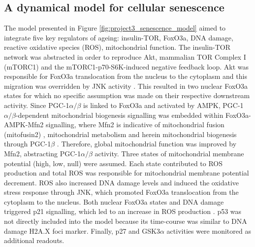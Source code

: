 \subsection{A dynamical model for cellular senescence}
\label{project3-subsec:A dynamical model for cellular senescence}
The model presented in Figure \ref{fig:project3_senescence_model} aimed to integrate five key regulators of ageing: insulin-TOR, FoxO3a, DNA damage, reactive oxidative species (ROS), mitochondrial function. The insulin-TOR network was abstracted in order to reproduce Akt, mammalian TOR Complex I (mTORC1) and the mTORC1-p70-S6K-induced negative feedback loop. Akt was responsible for FoxO3a translocation from the nucleus to the cytoplasm and this migration was overridden by JNK activity \citep{Brunet2004, Greer2005, Greer2008}. This resulted in two nuclear FoxO3a states for which no specific assumption was made on their respective downstream activity. Since PGC-1$\alpha/\beta$ is linked to FoxO3a and activated by AMPK, PGC-1$\alpha/\beta$-dependent mitochondrial biogenesis signalling was embedded within FoxO3a-AMPK-Mfn2 signalling, where Mfn2 is indicative of mitochondrial fusion (mitofusin2) \citep{Koshiba2004}, mitochondrial metabolism \citep{Bach2003} and herein mitochondrial biogenesis through PGC-1$\beta$ 
\citep{Soriano2006, Liesa2008}. Therefore, global mitochondrial function was improved by Mfn2, abstracting PGC-1$\alpha/\beta$ activity. Three states of mitochondrial membrane potential (high, low, null) were assumed. Each state contributed to ROS production and total ROS was responsible for mitochondrial membrane potential decrement. ROS also increased DNA damage levels and induced the oxidative stress response through JNK, which promoted FoxO3a translocation from the cytoplasm to the nucleus. Both nuclear FoxO3a states and DNA damage triggered p21 signalling, which led to an increase in ROS production \citep{Passos2010}. p53 was not directly included into the model because its time-course was similar to DNA damage H2A.X foci marker. Finally, p27 and GSK3$\alpha$ activities were monitored as additional readouts.


